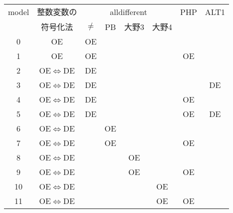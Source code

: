  \begin{tabular}[c] {|c|c|c|c|c|c|c|c|}\hline
  model & 整数変数の            & \multicolumn{4}{|c|}{alldifferent} & PHP & ALT1 \\\cline{3-6}
        & 符号化法              & $\neq$ & PB & 大野3 & 大野4       &     &      \\\hline
  0     & OE                    & OE      &    &       &             &     &      \\
  1     & OE                    & OE      &    &       &             & OE  &      \\
  2     & OE$\Leftrightarrow$DE & DE      &    &       &             &     &      \\
  3     & OE$\Leftrightarrow$DE & DE      &    &       &             &     & DE   \\
  4     & OE$\Leftrightarrow$DE & DE      &    &       &             & OE  &      \\
  5     & OE$\Leftrightarrow$DE & DE      &    &       &             & OE  & DE   \\
  6     & OE$\Leftrightarrow$DE &         & OE &       &             &     &      \\
  7     & OE$\Leftrightarrow$DE &         & OE &       &             & OE  &      \\
  8     & OE$\Leftrightarrow$DE &         &    & OE    &             &     &      \\
  9     & OE$\Leftrightarrow$DE &         &    & OE    &             & OE  &      \\
  10    & OE$\Leftrightarrow$DE &         &    &       & OE          &     &      \\
  11    & OE$\Leftrightarrow$DE &         &    &       & OE          & OE  &      \\\hline
 \end{tabular}
